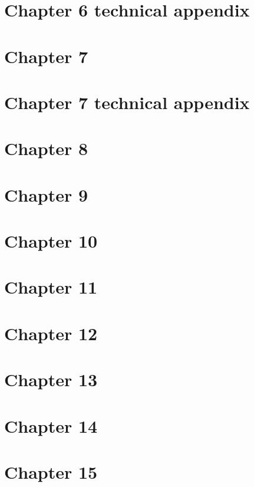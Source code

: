 \documentclass[10pt]{article}
\begin{document}
  \newpage
  \section*{Chapter 6 technical appendix}
  
  
  \newpage
  \section*{Chapter 7}
  
  
  \newpage
  \section*{Chapter 7 technical appendix}
  
  
  \newpage
  \section*{Chapter 8}
  
  
  \newpage
  \section*{Chapter 9}
  
  
  \newpage
  \section*{Chapter 10}
  
  
  \newpage
  \section*{Chapter 11}
  
	  
  \newpage
  \section*{Chapter 12}
  
  
  \newpage
  \section*{Chapter 13}
  
  
  \newpage
  \section*{Chapter 14}
  
  
  \newpage
  \section*{Chapter 15}
  
\end{document}
